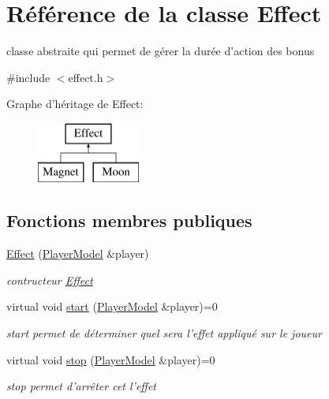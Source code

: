 \hypertarget{class_effect}{\section{Référence de la classe Effect}
\label{class_effect}
}


classe abstraite qui permet de gérer la durée d'action des bonus  




{\ttfamily \#include $<$effect.\+h$>$}

Graphe d'héritage de Effect\+:\begin{figure}[H]
\begin{center}
\leavevmode
\includegraphics[height=2.000000cm]{class_effect}
\end{center}
\end{figure}
\subsection*{Fonctions membres publiques}
\begin{DoxyCompactItemize}
\item 
\hyperlink{class_effect_ae779bc72f0627ad4f0d9f059b632930b}{Effect} (\hyperlink{class_player_model}{Player\+Model} \&player)
\begin{DoxyCompactList}\small\item\em contructeur \hyperlink{class_effect}{Effect} \end{DoxyCompactList}\item 
virtual void \hyperlink{class_effect_adb5fb4b0bfa4099ce418783ff74dfa1a}{start} (\hyperlink{class_player_model}{Player\+Model} \&player)=0
\begin{DoxyCompactList}\small\item\em start permet de déterminer quel sera l'effet appliqué sur le joueur \end{DoxyCompactList}\item 
virtual void \hyperlink{class_effect_ac8b826d884bfdfc41a2286bcbb4c7dab}{stop} (\hyperlink{class_player_model}{Player\+Model} \&player)=0
\begin{DoxyCompactList}\small\item\em stop permet d'arrêter cet l'effet \end{DoxyCompactList}\end{DoxyCompactItemize}


